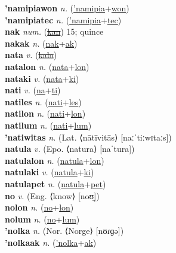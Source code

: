 \textbf{'namipiawon} \textit{n.} (\hyperref['namipia]{'namipia}+\hyperref[won]{won})
 \label{'namipiawon} \\
\textbf{'namipiatec} \textit{n.} (\hyperref['namipia]{'namipia}+\hyperref[tec]{tec})
 \label{'namipiatec} \\
\textbf{nak} \textit{num.} (\hyperref[kan]{\sout{kan}})
15; quince \label{nak} \\
\textbf{nakak} \textit{n.} (\hyperref[nak]{nak}+\hyperref[ak]{ak})
 \label{nakak} \\
\textbf{nata} \textit{v.} (\hyperref[kala]{\sout{kala}})
 \label{nata} \\
\textbf{natalon} \textit{n.} (\hyperref[nata]{nata}+\hyperref[lon]{lon})
 \label{natalon} \\
\textbf{nataki} \textit{v.} (\hyperref[nata]{nata}+\hyperref[ki]{ki})
 \label{nataki} \\
\textbf{nati} \textit{v.} (\hyperref[na]{na}+\hyperref[ti]{ti})
 \label{nati} \\
\textbf{natiles} \textit{n.} (\hyperref[nati]{nati}+\hyperref[les]{les})
 \label{natiles} \\
\textbf{natilon} \textit{n.} (\hyperref[nati]{nati}+\hyperref[lon]{lon})
 \label{natilon} \\
\textbf{natilum} \textit{n.} (\hyperref[nati]{nati}+\hyperref[lum]{lum})
 \label{natilum} \\
\textbf{'natiwitas} \textit{n.} (Lat. ⟨nātīvitās⟩ [naːˈtiːwɪtaːs])
 \label{'natiwitas} \\
\textbf{natula} \textit{v.} (Epo. ⟨natura⟩ [naˈtura])
 \label{natula} \\
\textbf{natulalon} \textit{n.} (\hyperref[natula]{natula}+\hyperref[lon]{lon})
 \label{natulalon} \\
\textbf{natulaki} \textit{v.} (\hyperref[natula]{natula}+\hyperref[ki]{ki})
 \label{natulaki} \\
\textbf{natulapet} \textit{n.} (\hyperref[natula]{natula}+\hyperref[pet]{pet})
 \label{natulapet} \\
\textbf{no} \textit{v.} (Eng. ⟨know⟩ [noʊ̯])
 \label{no} \\
\textbf{nolon} \textit{n.} (\hyperref[no]{no}+\hyperref[lon]{lon})
 \label{nolon} \\
\textbf{nolum} \textit{n.} (\hyperref[no]{no}+\hyperref[lum]{lum})
 \label{nolum} \\
\textbf{'nolka} \textit{n.} (Nor. ⟨Norge⟩ [nʊɾɡə])
 \label{'nolka} \\
\textbf{'nolkaak} \textit{n.} (\hyperref['nolka]{'nolka}+\hyperref[ak]{ak})
